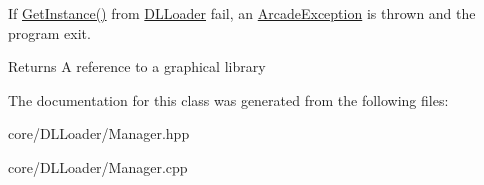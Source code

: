 If {\ttfamily \hyperlink{class_manager_a8cb265f0bd19351a88df4c167ece1377}{Get\+Instance()}} from \hyperlink{class_d_l_loader}{D\+L\+Loader} fail, an \hyperlink{class_arcade_exception}{Arcade\+Exception} is thrown and the program exit.

\begin{DoxyReturn}{Returns}
A reference to a graphical library 
\end{DoxyReturn}


The documentation for this class was generated from the following files\+:\begin{DoxyCompactItemize}
\item 
core/\+D\+L\+Loader/Manager.\+hpp\item 
core/\+D\+L\+Loader/Manager.\+cpp\end{DoxyCompactItemize}
